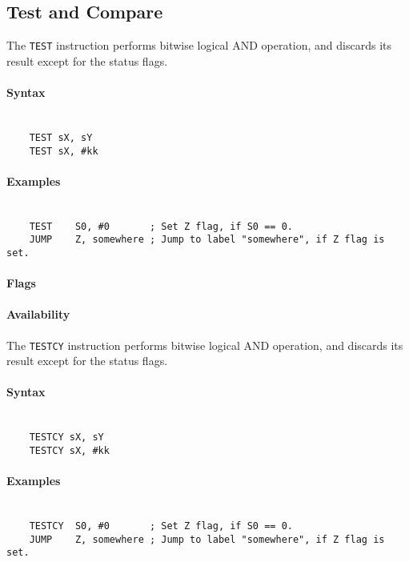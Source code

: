 \subsection{Test and Compare}
        The \texttt{TEST} instruction performs bit\-wise logical AND operation, and discards its result except for the status flags.

        \paragraph{Syntax}
            ~\\
            \verb'    TEST sX, sY'\\
            \verb'    TEST sX, #kk'

        \paragraph{Examples}
            ~\\
            \verb'    TEST    S0, #0       ; Set Z flag, if S0 == 0.'\\
            \verb'    JUMP    Z, somewhere ; Jump to label "somewhere", if Z flag is set.'

        \paragraph{Flags}

        \paragraph{Availability}
            \pbavailability{\yes}{\yes}{\no}{\no}{\no}

    \clearpage
        The \texttt{TESTCY} instruction performs bit\-wise logical AND operation, and discards its result except for the status flags.

        \paragraph{Syntax}
            ~\\
            \verb'    TESTCY sX, sY'\\
            \verb'    TESTCY sX, #kk'

        \paragraph{Examples}
            ~\\
            \verb'    TESTCY  S0, #0       ; Set Z flag, if S0 == 0.'\\
            \verb'    JUMP    Z, somewhere ; Jump to label "somewhere", if Z flag is set.'

